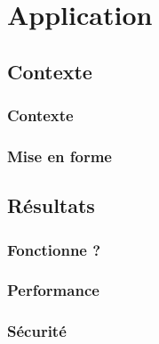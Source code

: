 \section{Application}

\subsection{Contexte}

\begin{frame}
\frametitle{Contexte}
\end{frame}

\begin{frame}
\frametitle{Mise en forme}
\end{frame}

\subsection{Résultats}

\begin{frame} %
\frametitle{Fonctionne ?}
\end{frame}

\begin{frame}
\frametitle{Performance}
\end{frame}

\begin{frame}
\frametitle{Sécurité}
\end{frame}

